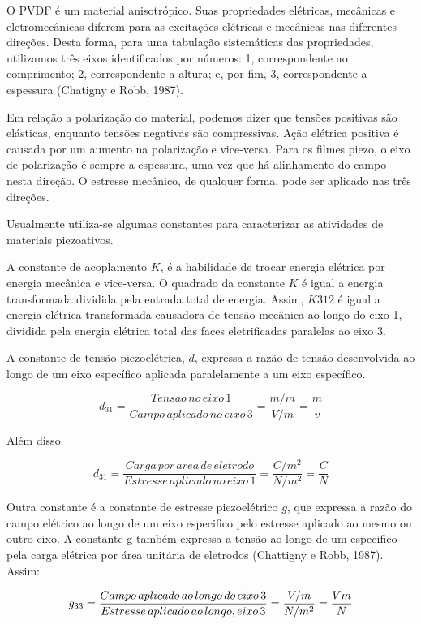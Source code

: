 \documentclass[
	12pt,				
	oneside,			
	a4paper,			
	english,			
	brazil				
	]{abntex2ppgsi}
\begin{document}
O PVDF é um material anisotrópico.  Suas propriedades elétricas, mecânicas e eletromecânicas diferem para as excitações elétricas e mecânicas nas diferentes direções. Desta forma, para uma tabulação sistemáticas das propriedades, utilizamos três eixos identificados por números: 1, correspondente ao comprimento; 2, correspondente a altura; e, por fim, 3, correspondente a espessura (Chatigny e Robb, 1987). 

Em relação a polarização do material, podemos dizer que tensões positivas são elásticas, enquanto tensões negativas são compressivas. Ação elétrica positiva é causada por um aumento na polarização e vice-versa. Para os filmes piezo, o eixo de polarização é sempre a espessura, uma vez que há alinhamento do campo nesta direção. O estresse mecânico, de qualquer forma, pode ser aplicado nas três direções. 

Usualmente utiliza-se algumas constantes para caracterizar as atividades de materiais piezoativos. 

A constante de acoplamento $K$, é a habilidade de trocar energia elétrica por energia mecânica e vice-versa. O quadrado da constante $K$ é igual a energia transformada dividida pela entrada total de energia. Assim, $K312$ é igual a energia elétrica transformada causadora de tensão mecânica ao longo do eixo 1, dividida pela energia elétrica total das faces eletrificadas paralelas ao eixo 3. 

A constante de tensão piezoelétrica, $d$, expressa a razão de tensão desenvolvida ao longo de um eixo específico aplicada paralelamente a um eixo específico. 

\[d_{31} = \frac{Tensao \,no \,eixo \,1}{Campo \,aplicado \,no \,eixo \,3} = \frac{m/m}{V/m} = \frac{m}{v} \]

Além disso

\[d_{31} = \frac{Carga \,por \,area \,de \,eletrodo}{Estresse \,aplicado \,no \,eixo \,1} = \frac{C/m^{2}}{N/m^{2}} = \frac{C}{N} \]

Outra constante é a constante de estresse piezoelétrico $g$, que expressa a razão do campo elétrico ao longo de um eixo especifico pelo estresse aplicado ao mesmo ou outro eixo. A constante g também expressa a tensão ao longo de um especifico pela carga elétrica por área unitária de eletrodos (Chattigny e Robb, 1987). Assim:

\[g_{33} = \frac{Campo \,aplicado \,ao \,longo \,do \,eixo \,3}{Estresse \,aplicado \,ao \,longo ,\do \,eixo \,3} = \frac{V/m}{N/m^{2}} = \frac{Vm}{N} \]
\end{document}
